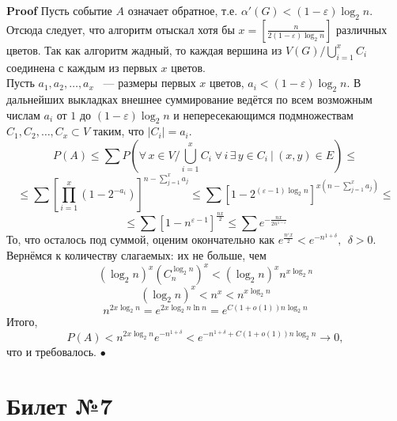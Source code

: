 \documentclass[a4paper]{article}
\theoremstyle{plain}
\theoremstyle{remark}
\theoremstyle{definition}
\renewenvironment{proof}{{\bfseries Proof}}{$\bullet$}
\newcommand{\myequat}[1]{\begin{equation} #1 \nonumber \end{equation}}
\newcommand{\class}[1]{\left[ #1 \right]} %
\newcommand{\myO}{(1+o(1))}
\begin{document}
\begin{proof} Пусть событие $A$ означает обратное, т.е. $\alpha'(G)<(1-\varepsilon)\log_2 n$. Отсюда следует, что алгоритм отыскал хотя бы $x=\class{\frac{n}{2(1-\varepsilon)\log_2 n}}$ различных цветов. Так как алгоритм жадный, то каждая вершина из $V(G)/\bigcup_{i=1}^xC_i$ соединена с каждым из первых $x$ цветов.\\
Пусть $a_1,a_2,\dots,a_x$ ~--- размеры первых $x$ цветов, $a_i<(1-\varepsilon)\log_2 n$. В дальнейших выкладках внешнее суммирование ведётся по всем возможным числам $a_i$ от $1$ до $(1-\varepsilon)\log_2 n$ и непересекающимся подмножествам $C_1,C_2,\dots,C_x\subset V$ таким, что $|C_i|=a_i$.
\myequat{P(A)\leq \sum P(\forall\,x\in V/\bigcup_{i=1}^xC_i\;\forall\,i\,\exists\, y\in C_i\: | \: (x,y)\in E)\leq}
\myequat{\leq\sum \class{\prod_{i=1}^x(1-2^{-a_i})}^{n-\sum_{j=1}^xa_j}\leq\sum\class{1-2^{(\varepsilon-1)\log_2 n}}^{x(n-\sum_{j=1}^xa_j)}\leq}
\myequat{\leq\sum [1-n^{\varepsilon-1}]^{\frac{nx}{2}}\leq\sum e^{-\frac{nx}{2n^{1-\varepsilon}}}}
То, что осталось под суммой, оценим окончательно как $e^{\frac{n^{\varepsilon}x}{2}}<e^{-n^{1+\delta}},\:\:\delta>0$.\\
Вернёмся к количеству слагаемых: их не больше, чем
\myequat{(\log_2 n)^x (C_n^{\log_2 n})^x<(\log_2 n)^x n^{x\log_2 n}}
\myequat{(\log_2 n)^x<n^x<n^{x\log_2 n}}
\myequat{n^{2x\log_2 n}=e^{2x\log_2 n\ln n}=e^{C\myO n\log_2 n}}
Итого,
\myequat{P(A)<n^{2x\log_2 n}e^{-n^{1+\delta }}<e^{-n^{1+\delta}+C\myO n\log_2 n}\to 0,}
что и требовалось.
\end{proof}

\section{Билет №7}
\end{document}
